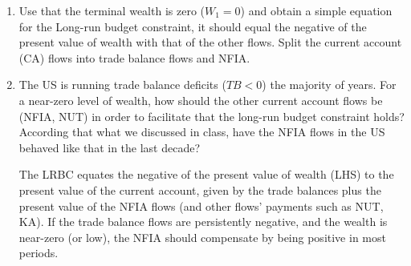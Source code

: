 \documentclass[11pt,dvipsnames]{article} %
\newif \ifAnswers
\begin{document}
\begin{enumerate}
\begin{enumerate}
			\fi
			
			\item Use that the terminal wealth is zero ($W_1 = 0$) and obtain a simple equation for the Long-run budget constraint, it should equal the negative of the present value of wealth with that of the other flows. Split the current account (CA) flows into trade balance flows and NFIA. 
			
			\ifAnswers
			
			{\color{Blue}
				\begin{framed}
						We substitute $W_1=0$ in the equation for wealth in the last period and solve for $W_0$:
						\[ W_0 = -\frac{TB_1}{1+r^*} - \frac{NUT_1}{1+r^*}\]
						Now we replace this in the equation for the wealth in the initial period:
						\begin{gather*}
							-\frac{TB_1}{1+r^*} - \frac{NUT_1}{1+r^*}	= TB_0 + NUT_0 + (1+r^*)W_{-1}
						\end{gather*}
						Rearranging:
						\begin{gather*}
							-(1+r^*)W_{-1} = TB_0 + NUT_0 + \frac{TB_1}{1+r^*} + \frac{NUT_1}{1+r^*} \\
							\underset{(1)}{\underbrace{-(1+r^*)W_{-1}} }= \underset{(2)}{\underbrace{TB_0 + \frac{TB_1}{1+r^*} }}+ \underset{(3)}{\underbrace{NUT_0 + \frac{NUT_1}{1+r^*}}}
						\end{gather*}
					
					Here: \\
					
					$(1):$ Present value (PV) of initial wealth\\
					$(2):$ PV of trade balance flows\\
					$(3):$ PV of net unilateral transfers flows\\
					$(2) + (3):$ PV of CA flows \\
				\end{framed}%
			}
	
			\fi
				
			\item The US is running trade balance deficits ($TB<0$) the majority of years. For a near-zero level of wealth, how should the other current account flows be (NFIA, NUT) in order to facilitate that the long-run budget constraint holds? According that what we discussed in class, have the NFIA flows in the US behaved like that in the last decade? 
			
			\ifAnswers
			
			{\color{Blue}
				\begin{framed}
					The LRBC equates the negative of the present value of wealth (LHS) to the present value of the current account, given by the trade balances plus the present value of the NFIA flows (and other flows' payments such as NUT, KA). If the trade balance flows are persistently negative, and the wealth is near-zero (or low), the NFIA should compensate by being positive in most periods. \\
					

\end{framed}}
\end{enumerate}
\end{enumerate}
\end{document}
